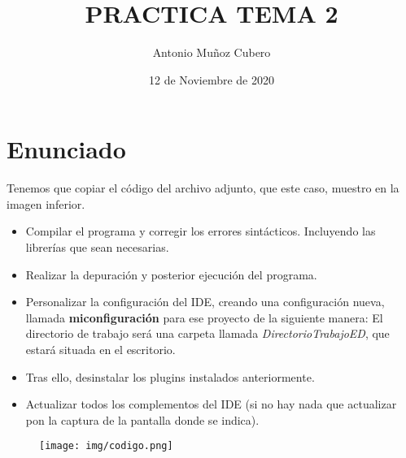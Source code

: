 \documentclass{article}
\title{PRACTICA TEMA 2}
\author{Antonio Muñoz Cubero}
\date{12 de Noviembre de 2020}
\begin{document}
  \maketitle
  \pagestyle{fancy}
  
  \newpage
    \tableofcontents

  \newpage
    \section{Enunciado}
    
    Tenemos que copiar  el  código del archivo adjunto, que este caso, muestro en la imagen inferior.
    \begin{itemize}      
      \item Compilar el programa y corregir los errores sintácticos. Incluyendo las librerías que sean necesarias.
      \item Realizar la depuración y posterior ejecución del programa.
      \item Personalizar la configuración del IDE, creando una configuración nueva, llamada \textbf{miconfiguración} para ese proyecto de la siguiente manera: 
      El directorio de trabajo será una carpeta llamada \textit{DirectorioTrabajoED}, que estará situada en el escritorio.
      \item Tras ello, desinstalar los plugins instalados anteriormente.
      \item Actualizar todos los complementos del IDE (si no hay nada que actualizar pon la captura de la pantalla donde se indica).
    \end{itemize}

    \begin{figure}[h]
      \centering
      \texttt{[image: img/codigo.png]}
    \end{figure}
\end{document}
